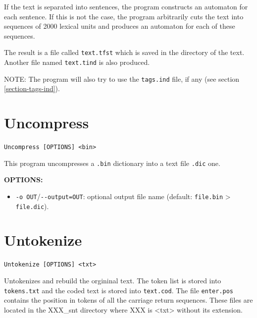 \bigskip
\noindent If the text is separated into sentences, the program constructs an
automaton for each sentence. If this is not the case, the program arbitrarily
cuts the text into sequences of 2000 lexical units and produces an automaton for
each of these sequences.

\bigskip
\noindent The result is a file called \verb+text.tfst+ which is saved in the directory of
the text. Another file named \verb+text.tind+ is also produced.

\bigskip
\noindent NOTE: The program will also try to use the \verb+tags.ind+ file, if
any (see section \ref{section-tags-ind}).







\section{Uncompress}
\label{section-Uncompress}
\verb+Uncompress [OPTIONS] <bin>+

\bigskip
\noindent This program uncompresses a \verb+.bin+ dictionary into a text file
\verb+.dic+ one.

\bigskip
\noindent \textbf{OPTIONS:}
\begin{itemize}
  \item \verb+-o OUT+/\verb+--output=OUT+: optional output file name (default:
  \verb+file.bin+ > \verb+file.dic+).
\end{itemize}








\section{Untokenize}
\label{section-Untokenize}
\verb+Untokenize [OPTIONS] <txt>+

\bigskip
\noindent Untokenizes and rebuild the orgininal text. The token list is stored into \verb+tokens.txt+ and
         the coded text is stored into \verb+text.cod+.
         The file \verb+enter.pos+ contains the position in tokens of all the carriage return sequences.
         These files are located in the XXX\_snt directory where XXX is <txt> without its extension.

